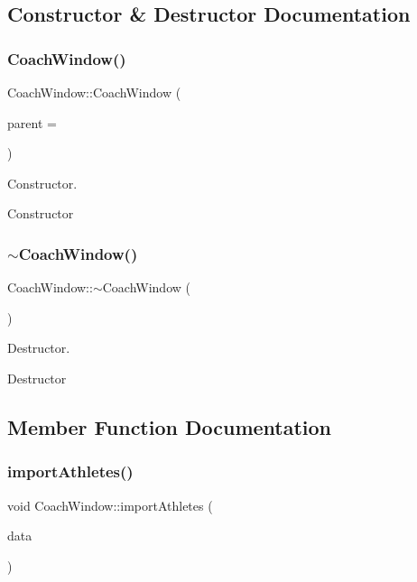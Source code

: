 \subsection{Constructor \& Destructor Documentation}
\mbox{\label{classCoachWindow_ad5fe46b8ca97449f3d3cb0c072b61cf7}} 
\subsubsection{\texorpdfstring{CoachWindow()}{CoachWindow()}}
{\footnotesize\ttfamily Coach\+Window\+::\+Coach\+Window (\begin{DoxyParamCaption}\item[{Q\+Widget $\ast$}]{parent = {} }\end{DoxyParamCaption})\hspace{0.3cm}{\ttfamily [explicit]}}



Constructor. 

Constructor \mbox{\label{classCoachWindow_a7ac9500ae70bf19813a9ceb04259dd17}} 
\subsubsection{\texorpdfstring{$\sim$CoachWindow()}{~CoachWindow()}}
{\footnotesize\ttfamily Coach\+Window\+::$\sim$\+Coach\+Window (\begin{DoxyParamCaption}{ }\end{DoxyParamCaption})}



Destructor. 

Destructor 

\subsection{Member Function Documentation}
\mbox{\label{classCoachWindow_a6ca2df6c1b3dc97435beb1ff0cfb33fa}} 
\subsubsection{\texorpdfstring{importAthletes()}{importAthletes()}}
{\footnotesize\ttfamily void Coach\+Window\+::import\+Athletes (\begin{DoxyParamCaption}\item[{\mbox{\hyperlink{classAthletesDataContainer}{Athletes\+Data\+Container}}}]{data }\end{DoxyParamCaption})}



